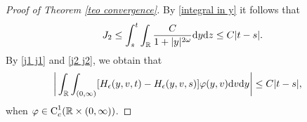 \documentclass[11pt]{article}
\numberwithin{equation}{section}
\newcommand{\der}{\textup{d}}
\begin{document}
\begin{proof}[Proof of Theorem \ref{teo convergence}]
By \eqref{integral in y} it follows that
\begin{align}\label{j2 j2}
J_{2}\leq \int_{s}^{t}\int_{\mathbb{R}} \frac{C}{1+|y|^{2\omega}}\der y\der z\leq C|t-s|.
\end{align}
By \eqref{j1 j1} and \eqref{j2 j2}, we obtain that
\begin{align}\label{equicontinuity c1}
    \bigg|\int_{\mathbb{R}}\int_{(0,\infty)} &[H_{\epsilon}(y,v,t)-H_{\epsilon}(y,v,s)]\varphi(y,v)\der v \der y\bigg|\leq C|t-s|,
\end{align}
when $\varphi\in\textup{C}^{1}_{c}(\mathbb{R}\times(0,\infty)) $.





\end{proof}
\end{document}
